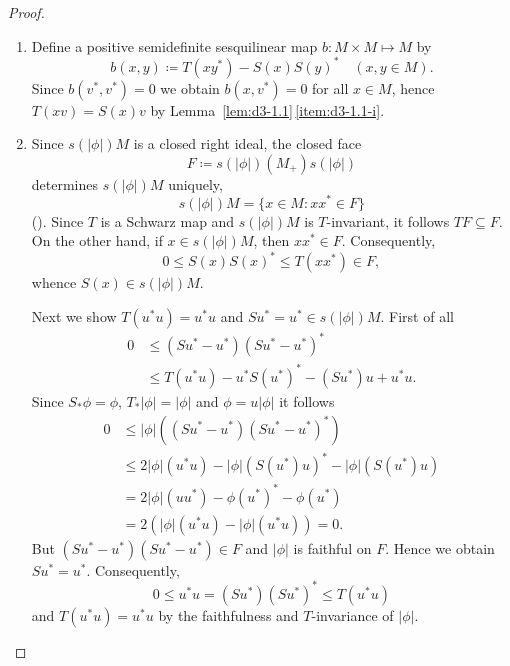 \begin{proof}
\begin{enumerate}[\upshape (i), wide, labelindent=.25em]
\item 
Define a positive semidefinite sesquilinear map $b: M\times M \mapsto M$ by
\[
b(x,y) \coloneq T(xy^{*}) - S(x)S(y)^{*} \quad (x, y\in M).
\]
Since $b(v^{*},v^{*}) = 0$ we obtain $b(x,v^{*}) = 0$ for all $x \in M$,  hence $T(xv) = S(x)v$ by Lemma~\ref{lem:d3-1.1}\,\ref{item:d3-1.1-i}.

\item
Since $s(|\phi|)M$ is a closed right ideal, the closed face 
%
\[
	F \coloneq s(|\phi|)(M_{+})s(|\phi|) 
\]
%
determines $s(|\phi|)M$ uniquely, \ie
\[
s(|\phi|)M = \{x \in M \colon xx^{*} \in F\}
\]
(\textcite[Theorem 1.5.2]{pedersen:1979}). 
Since $T$ is a Schwarz map and $s(|\phi|)M$ is $T$-invariant, it follows $TF \subseteq F$.
On the other hand, if\/ $x \in s(|\phi|)M$, then $xx^{*} \in F$.
Consequently,
\[
0 \leq S(x)S(x)^{*} \leq T(xx^{*}) \in F,
\]
whence $S(x) \in s(|\phi|)M$.

Next we show $T(u^{*}u) = u^{*}u$ and $Su^{*} = u^{*} \in s(|\phi|)M$.
First of all
\begin{align*}
	0 &\leq (Su^{*} - u^{*})(Su^{*} - u^{*})^{*} \\
	& \leq T(u^{*}u) - u^{*}S(u^{*})^{*} - (Su^{*})u + u^{*}u.
\end{align*}
Since $ S_{*}\phi = \phi $, $ T_{*}|\phi| = |\phi| $ and $ \phi = u|\phi| $ it follows
\begin{align*}
	0 &\leq |\phi|((Su^{*} - u^{*})(Su^{*} - u^{*})^{*}) \\
	& \leq 2|\phi|(u^{*}u) - |\phi|(S(u^{*})u)^{*} - |\phi|(S(u^{*})u) \\
	& = 2|\phi|(uu^{*}) - \phi(u^{*})^{*} - \phi(u^{*}) \\
	& = 2(|\phi|(u^{*}u) - |\phi|(u^{*}u)) = 0.
\end{align*}
But $(Su^{*} - u^{*})(Su^{*} - u^{*}) \in F$ and $|\phi|$ is faithful on $F$.
Hence we obtain $Su^{*} = u^{*}$.
Consequently,
\[
	0 \leq u^{*}u = (Su^{*})(Su^{*})^{*} \leq T(u^{*}u)
\]
and $T(u^{*}u) = u^{*}u$ by the faithfulness and $T$-invariance of\/ $|\phi|$.
\qedhere
\end{enumerate}
\end{proof}
